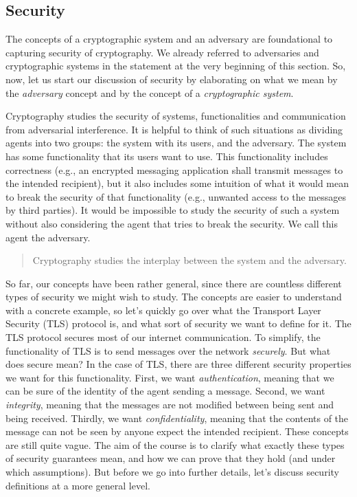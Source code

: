 \subsection{Security}\label{ssec:security-foundations}
The concepts of a cryptographic system and an adversary are foundational to capturing security of cryptography. We already referred to adversaries and cryptographic systems in the statement at the very beginning of this section. So, now, let us start our discussion of security by elaborating on what we mean by the \emph{adversary} concept and by the concept of a \emph{cryptographic system}.

Cryptography studies the security of systems, functionalities and communication from adversarial interference. It is helpful to think of such situations as dividing agents into two groups: the system with its users, and the adversary. The system has some functionality that its users want to use. This functionality includes correctness (e.g., an encrypted messaging application shall transmit messages to the intended recipient), but it also includes some intuition of what it would mean to break the security of that functionality (e.g., unwanted access to the messages by third parties). It would be impossible to study the security of such a system without also considering the agent that tries to break the security. We call this agent the adversary.
\begin{quote}
    Cryptography studies the interplay between the system and the adversary.
\end{quote}


So far, our concepts have been rather general, since there are countless different types of security we might wish to study. The concepts are easier to understand with a concrete example, so let's quickly go over what the Transport Layer Security (TLS) protocol is, and what sort of security we want to define for it. The TLS protocol secures most of our internet communication. To simplify, the functionality of TLS is to send messages over the network \emph{securely}. But what does secure mean? In the case of TLS, there are three different security properties we want for this functionality. First, we want \emph{authentication}, meaning that we can be sure of the identity of the agent sending a message. Second, we want \emph{integrity}, meaning that the messages are not modified between being sent and being received. Thirdly, we want \emph{confidentiality}, meaning that the contents of the message can not be seen by anyone expect the intended recipient. These concepts are still quite vague. The aim of the course is to clarify what exactly these types of security guarantees mean, and how we can prove that they hold (and under which assumptions). But before we go into further details, let's discuss security definitions at a more general level.

